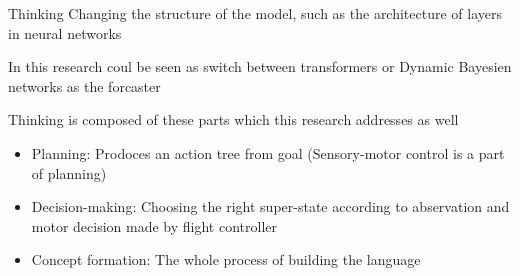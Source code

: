 \begin{frame}{Thinking}
    Changing the structure of the model, such as the architecture of layers in neural networks
    
    In this research coul be seen as switch between transformers or Dynamic Bayesien networks as the forcaster
    
    Thinking is composed of these parts which this research addresses as well
    \begin{itemize}
        \item Planning: Prodoces an action tree from goal (Sensory-motor control is a part of planning)
        \item Decision-making: Choosing the right super-state according to abservation and motor decision made by flight controller
        \item Concept formation: The whole process of building the language
    \end{itemize}

\end{frame}